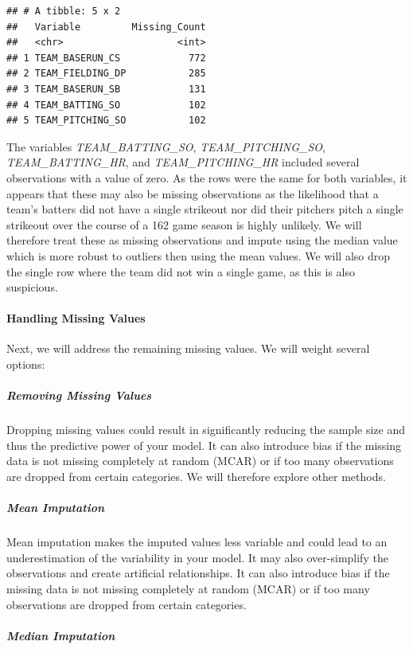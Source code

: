 \documentclass[
]{article}
\begin{document}
\begin{verbatim}
## # A tibble: 5 x 2
##   Variable         Missing_Count
##   <chr>                    <int>
## 1 TEAM_BASERUN_CS            772
## 2 TEAM_FIELDING_DP           285
## 3 TEAM_BASERUN_SB            131
## 4 TEAM_BATTING_SO            102
## 5 TEAM_PITCHING_SO           102
\end{verbatim}

The variables \emph{TEAM\_BATTING\_SO}, \emph{TEAM\_PITCHING\_SO},
\emph{TEAM\_BATTING\_HR}, and \emph{TEAM\_PITCHING\_HR} included several
observations with a value of zero. As the rows were the same for both
variables, it appears that these may also be missing observations as the
likelihood that a team's batters did not have a single strikeout nor did
their pitchers pitch a single strikeout over the course of a 162 game
season is highly unlikely. We will therefore treat these as missing
observations and impute using the median value which is more robust to
outliers then using the mean values. We will also drop the single row
where the team did not win a single game, as this is also suspicious.

\paragraph{Handling Missing Values}\label{handling-missing-values}

Next, we will address the remaining missing values. We will weight
several options:

\subparagraph{Removing Missing Values}\label{removing-missing-values}

Dropping missing values could result in significantly reducing the
sample size and thus the predictive power of your model. It can also
introduce bias if the missing data is not missing completely at random
(MCAR) or if too many observations are dropped from certain categories.
We will therefore explore other methods.

\subparagraph{Mean Imputation}\label{mean-imputation}

Mean imputation makes the imputed values less variable and could lead to
an underestimation of the variability in your model. It may also
over-simplify the observations and create artificial relationships. It
can also introduce bias if the missing data is not missing completely at
random (MCAR) or if too many observations are dropped from certain
categories.

\subparagraph{Median Imputation}\label{median-imputation}
\end{document}
